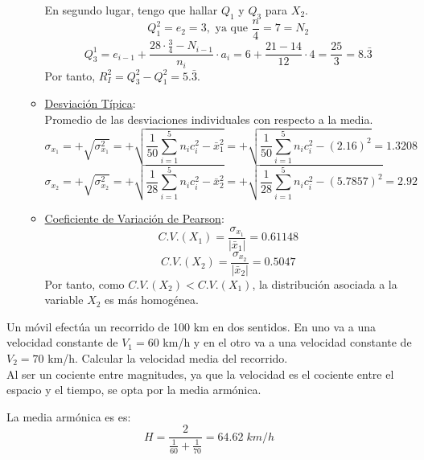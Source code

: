 \begin{ejercicio}
\begin{enumerate}
\begin{itemize}
            En segundo lugar, tengo que hallar $Q_1$ y $Q_3$ para $X_2$.
            $$Q_1^2 = e_2 =3,\text{ ya que } \frac{n}{4} = 7 = N_2$$
            $$Q_3^1 = e_{i-1}+\frac{28\cdot \frac{3}{4} - N_{i-1}}{n_i} \cdot a_i
            = 6+\frac{21 - 14}{12} \cdot 4 = \frac{25}{3} = 8.\bar{3}$$
            Por tanto, $R_I^2 = Q_3^2 - Q_1^2 = 5.\bar{3}$.

            \item \underline{Desviación Típica}:\\
Promedio de las desviaciones individuales  con respecto a la media.
            $$\sigma_{x_1} = +\sqrt{\sigma_{x_1}^2} = +\sqrt{\frac{1}{50}\sum_{i=1}^5n_ic_i^2 - \bar{x}_1^2}
            =  +\sqrt{\frac{1}{50}\sum_{i=1}^5n_ic_i^2 - (2.16)^2} = 1.3208$$
            $$\sigma_{x_2} = +\sqrt{\sigma_{x_2}^2} = +\sqrt{\frac{1}{28}\sum_{i=1}^5n_ic_i^2 - \bar{x}_2^2}
            =  +\sqrt{\frac{1}{28}\sum_{i=1}^5n_ic_i^2 - (5.7857)^2} = 2.92$$

            \item \underline{Coeficiente de Variación de Pearson}:\\
            $$C.V.(X_1) = \frac{\sigma_{x_1}}{|\bar{x}_1|} = 0.61148$$
            $$C.V.(X_2) = \frac{\sigma_{x_2}}{|\bar{x}_2|} = 0.5047$$
            Por tanto, como $C.V.(X_2) < C.V.(X_1)$, la distribución asociada a la variable $X_2$ es más homogénea.
        \end{itemize}
    \end{enumerate}
\end{ejercicio}

\begin{ejercicio}
    Un móvil efectúa un recorrido de 100 km en dos sentidos. En uno va a una velocidad constante de $V_1=60$ km/h y en el otro va a una velocidad constante de $V_2=70$ km/h. Calcular la velocidad media del recorrido.\\

    Al ser un cociente entre magnitudes, ya que la velocidad es el cociente entre el espacio y el tiempo, se opta por la media armónica.
    
    La media armónica es es: $$H = \frac{2}{\frac{1}{60} + \frac{1}{70}} = 64.62\;km/h$$
\end{ejercicio}

